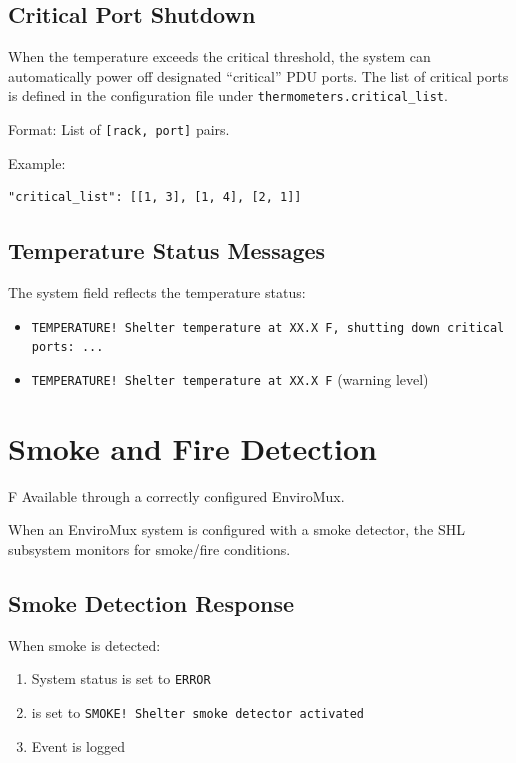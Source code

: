 \subsection{Critical Port Shutdown}

When the temperature exceeds the critical threshold, the system can automatically power off designated ``critical'' PDU ports. The list of critical ports is defined in the configuration file under \texttt{thermometers.critical\_list}.

Format: List of \texttt{[rack, port]} pairs.

Example:
\begin{verbatim}
"critical_list": [[1, 3], [1, 4], [2, 1]]
\end{verbatim}

\subsection{Temperature Status Messages}

The system  field reflects the temperature status:
\begin{itemize}
    \item \texttt{TEMPERATURE! Shelter temperature at XX.X F, shutting down critical ports: ...}
    \item \texttt{TEMPERATURE! Shelter temperature at XX.X F} (warning level)
\end{itemize}

\section{Smoke and Fire Detection}

\begin{newInVersion}{F}
Available through a correctly configured EnviroMux.
\end{newInVersion}

When an EnviroMux system is configured with a smoke detector, the SHL subsystem monitors for smoke/fire conditions.

\subsection{Smoke Detection Response}

When smoke is detected:
\begin{enumerate}
    \item System status is set to \texttt{ERROR}
    \item {} is set to \texttt{SMOKE! Shelter smoke detector activated}
    \item Event is logged
\end{enumerate}

